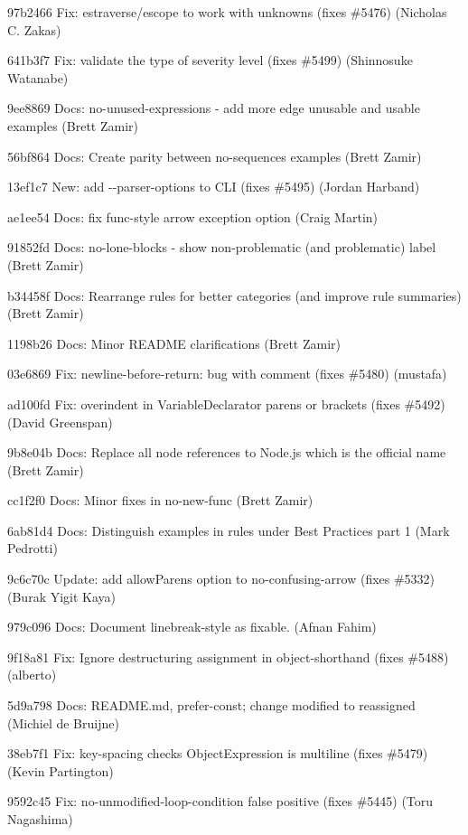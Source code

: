 \begin{DoxyItemize}
\item 97b2466 Fix\+: estraverse/escope to work with unknowns (fixes \#5476) (Nicholas C. Zakas)
\item 641b3f7 Fix\+: validate the type of severity level (fixes \#5499) (Shinnosuke Watanabe)
\item 9ee8869 Docs\+: no-\/unused-\/expressions -\/ add more edge unusable and usable examples (Brett Zamir)
\item 56bf864 Docs\+: Create parity between no-\/sequences examples (Brett Zamir)
\item 13ef1c7 New\+: add {\ttfamily -\/-\/parser-\/options} to C\+LI (fixes \#5495) (Jordan Harband)
\item ae1ee54 Docs\+: fix func-\/style arrow exception option (Craig Martin)
\item 91852fd Docs\+: no-\/lone-\/blocks -\/ show non-\/problematic (and problematic) label (Brett Zamir)
\item b34458f Docs\+: Rearrange rules for better categories (and improve rule summaries) (Brett Zamir)
\item 1198b26 Docs\+: Minor R\+E\+A\+D\+ME clarifications (Brett Zamir)
\item 03e6869 Fix\+: newline-\/before-\/return\+: bug with comment (fixes \#5480) (mustafa)
\item ad100fd Fix\+: overindent in Variable\+Declarator parens or brackets (fixes \#5492) (David Greenspan)
\item 9b8e04b Docs\+: Replace all node references to Node.\+js which is the official name (Brett Zamir)
\item cc1f2f0 Docs\+: Minor fixes in no-\/new-\/func (Brett Zamir)
\item 6ab81d4 Docs\+: Distinguish examples in rules under Best Practices part 1 (Mark Pedrotti)
\item 9c6c70c Update\+: add {\ttfamily allow\+Parens} option to {\ttfamily no-\/confusing-\/arrow} (fixes \#5332) (Burak Yigit Kaya)
\item 979c096 Docs\+: Document linebreak-\/style as fixable. (Afnan Fahim)
\item 9f18a81 Fix\+: Ignore destructuring assignment in {\ttfamily object-\/shorthand} (fixes \#5488) (alberto)
\item 5d9a798 Docs\+: R\+E\+A\+D\+M\+E.\+md, prefer-\/const; change modified to reassigned (Michiel de Bruijne)
\item 38eb7f1 Fix\+: key-\/spacing checks Object\+Expression is multiline (fixes \#5479) (Kevin Partington)
\item 9592c45 Fix\+: {\ttfamily no-\/unmodified-\/loop-\/condition} false positive (fixes \#5445) (Toru Nagashima)
\end{DoxyItemize}

